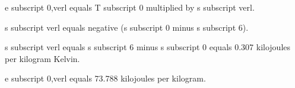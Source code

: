 e subscript 0,verl equals T subscript 0 multiplied by s subscript verl.  

s subscript verl equals negative (s subscript 0 minus s subscript 6).  

s subscript verl equals s subscript 6 minus s subscript 0 equals 0.307 kilojoules per kilogram Kelvin.  

e subscript 0,verl equals 73.788 kilojoules per kilogram.